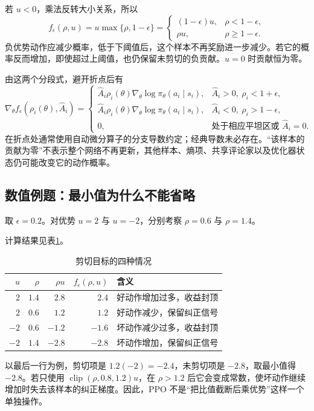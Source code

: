 \documentclass[UTF8]{ctexart}
\begin{document}
若 $u<0$，乘法反转大小关系，所以
\begin{equation}
  f_\epsilon(\rho,u)
  =u\max\{\rho,1-\epsilon\}
  =
  \begin{cases}
    (1-\epsilon)u,&\rho<1-\epsilon,\\
    \rho u,&\rho\ge1-\epsilon.
  \end{cases}
  \label{eq:ppo-negative-clip}
\end{equation}
负优势动作应减少概率，低于下阈值后，这个样本不再奖励进一步减少。若它的概率反而增加，即使超过上阈值，也仍保留未剪切的负贡献。$u=0$ 时贡献恒为零。

由这两个分段式，避开折点后有
\begin{equation}
  \nabla_\theta f_\epsilon(\rho_i(\theta),\widehat A_i)
  =
  \begin{cases}
    \widehat A_i\rho_i(\theta)
      \nabla_\theta\log\pi_\theta(a_i\mid s_i),
       & \widehat A_i>0,\ \rho_i<1+\epsilon,\\
    \widehat A_i\rho_i(\theta)
      \nabla_\theta\log\pi_\theta(a_i\mid s_i),
       & \widehat A_i<0,\ \rho_i>1-\epsilon,\\
    0,&\text{处于相应平坦区或 }\widehat A_i=0.
  \end{cases}
  \label{eq:ppo-clip-gradient}
\end{equation}
在折点处通常使用自动微分算子的分支导数约定；经典导数未必存在。“该样本的贡献为零”不表示整个网络不再更新，其他样本、熵项、共享评论家以及优化器状态仍可能改变它的动作概率。

\subsection{数值例题：最小值为什么不能省略}

\begin{example}[四种概率变化]
取 $\epsilon=0.2$。对优势 $u=2$ 与 $u=-2$，分别考察 $\rho=0.6$ 与 $\rho=1.4$。
\end{example}
\begin{solve}
计算结果见表\ref{tab:ppo-clipping-cases}。
\begin{table}
  \centering
  \caption{剪切目标的四种情况}
  \label{tab:ppo-clipping-cases}
  \begin{tabular}{rrrrl}
    \toprule
    $u$ & $\rho$ & $\rho u$ & $f_\epsilon(\rho,u)$ & 含义 \\
    \midrule
    $2$  & $1.4$ & $2.8$  & $2.4$  & 好动作增加过多，收益封顶 \\
    $2$  & $0.6$ & $1.2$  & $1.2$  & 好动作减少，保留纠正信号 \\
    $-2$ & $0.6$ & $-1.2$ & $-1.6$ & 坏动作减少过多，收益封顶 \\
    $-2$ & $1.4$ & $-2.8$ & $-2.8$ & 坏动作增加，保留纠正信号 \\
    \bottomrule
  \end{tabular}
\end{table}
以最后一行为例，剪切项是 $1.2(-2)=-2.4$，未剪切项是 $-2.8$，取最小值得 $-2.8$。若只使用
$\operatorname{clip}(\rho,0.8,1.2)u$，在 $\rho>1.2$ 后它会变成常数，使坏动作继续增加时失去该样本的纠正梯度。因此，PPO 不是“把比值截断后乘优势”这样一个单独操作。
\end{solve}
\end{document}
